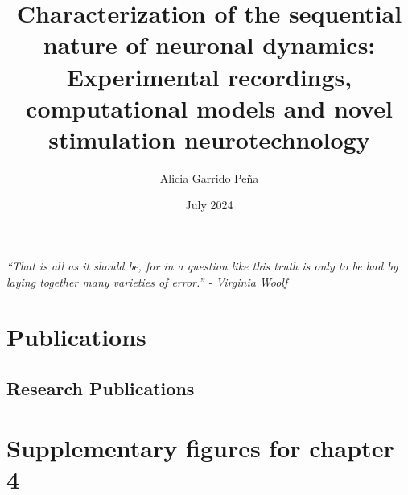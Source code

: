 \documentclass[11pt,a4paper,twoside]{book} %
\title{Characterization of the sequential nature of neuronal dynamics: Experimental recordings, computational models and novel stimulation neurotechnology}
\author{Alicia Garrido Peña}
\date{July 2024}
\numberwithin{equation}{section}
\begin{document}
 \maketitle

 \newpage
 \clearpage
 \newpage
 
 \newpage
 \clearpage
 \vfill
 {\centering \large \textit{``That is all as it should be, for in a question like this truth is only to be had by laying together many
 		varieties of error.'' - Virginia Woolf}\par}

 \vfill
 


 \tableofcontents
 \listoftables
 \listoffigures

 \newpage



\resetpagenumbering

 
 
 

 
 


\printbibliography


\begin{appendix}
\chapter{Publications}
 \section{Research Publications}

\begin{refsection}
\nocite{*}

\printbibliography[heading={subbibliography},title={Journal Publications},keyword=journal]

\printbibliography[heading={subbibliography},title={International Conference Contributions},keyword=conference]


\end{refsection}
\chapter{Supplementary figures for chapter 4}



%
% 


\end{appendix}
\end{document}
